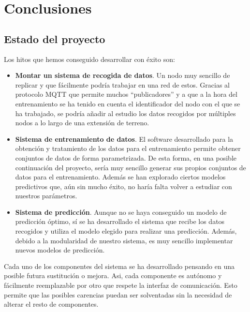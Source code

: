 \cleardoublepage

\chapter{Conclusiones}
\label{makereference8}

\section{Estado del proyecto}

Los hitos que hemos conseguido desarrollar con éxito son:
\begin{itemize}
\item \textbf{Montar un sistema de recogida de datos}. Un nodo muy sencillo de replicar y que fácilmente podría trabajar en una red de estos. Gracias al protocolo MQTT que permite muchos ``publicadores'' y a que a la hora del entrenamiento se ha tenido en cuenta el identificador del nodo con el que se ha trabajado, se podría añadir al estudio los datos recogidos por múltiples nodos a lo largo de una extensión de terreno.

\item \textbf{Sistema de entrenamiento de datos}. El software desarrollado para la obtención y tratamiento de los datos para el entrenamiento permite obtener conjuntos de datos de forma parametrizada. De esta forma, en una posible continuación del proyecto, sería muy sencillo generar sus propios conjuntos de datos para el entrenamiento. Además se han explorado ciertos modelos predictivos que, aún sin mucho éxito, no haría falta volver a estudiar con nuestros parámetros.

\item \textbf{Sistema de predicción}. Aunque no se haya conseguido un modelo de predicción óptimo, sí se ha desarrollado el sistema que recibe los datos recogidos y utiliza el modelo elegido para realizar una predicción. Además, debido a la modularidad de nuestro sistema, es muy sencillo implementar nuevos modelos de predicción.
\end{itemize}

Cada uno de los componentes del sistema se ha desarrollado pensando en una posible futura sustitución o mejora. Asi, cada componente es autónomo y fácilmente reemplazable por otro que respete la interfaz de comunicación. Esto permite que las posibles carencias puedan ser solventadas sin la necesidad de alterar el resto de componentes.

